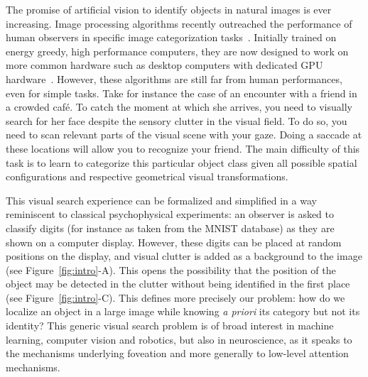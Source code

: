 The promise of artificial vision to identify objects in natural images is ever increasing. Image processing algorithms recently outreached the performance of human observers in specific image categorization tasks~\citep{He15}. Initially trained on energy greedy, high performance computers, they are now designed to work on more common hardware such as desktop computers with dedicated GPU hardware~\citep{Sandler18}. However, these algorithms are still far from human performances, even for simple tasks. Take for instance the case of an encounter with a friend in a crowded café. To catch the moment at which she arrives, you need to visually search for her face despite the sensory clutter in the visual field. To do so, you need to scan relevant parts of the visual scene with your gaze. Doing a saccade at these locations will allow you to recognize your friend. The main difficulty of this task is to learn to categorize this particular object class given all possible spatial configurations and respective geometrical visual transformations. 

This visual search experience can be formalized and simplified in a way reminiscent to classical psychophysical experiments: an observer is asked to classify digits (for instance as taken from the MNIST database) as they are shown on a computer display. However, these digits can be placed at random positions on the display, and visual clutter is added as a background to the image (see Figure~\ref{fig:intro}-A). This opens the possibility that the position of the object may be detected in the clutter without being identified in the first place (see Figure~\ref{fig:intro}-C). This defines more precisely our problem: how do we localize an object in a large image while knowing \emph{a priori} its category but not its identity? This generic visual search problem is of broad interest in machine learning, computer vision and robotics, but also in neuroscience, as it speaks to the mechanisms underlying foveation and more generally to low-level attention mechanisms.

